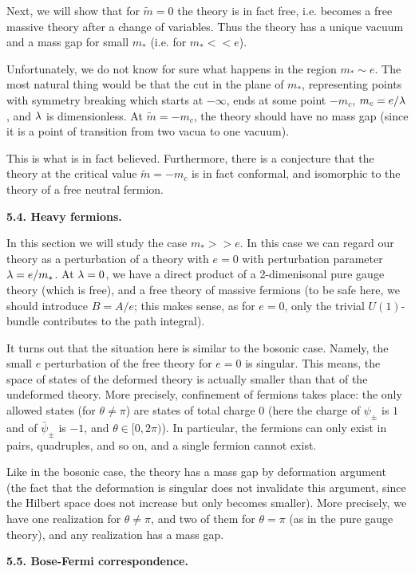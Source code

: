 Next, we will show that for $\tilde m=0$ the theory is in fact free,
i.e. becomes a free massive theory after a change of variables.
Thus the theory has a unique vacuum and a mass gap for small $m_*$
(i.e. for $m_*<<e$).  

Unfortunately, we do not know for sure what happens in the region $m_*\sim e$. 
The most natural thing would be
that the cut in the plane of $m_*$, representing points with symmetry 
breaking which starts at $-\infty$, ends at some point $-m_c$,
$m_c=e/\lambda$, and $\lambda$ is  dimensionless. 
At $\tilde m=-m_c$, the theory should have no mass gap (since it is a point 
of transition from two vacua to one vacuum).

This is what is in fact believed. Furthermore, there is a conjecture 
that the theory at the critical value $\tilde m=-m_c$ is in fact conformal, 
and isomorphic to the theory of a free neutral fermion. 

{\bf 5.4. Heavy fermions.}

In this section we will study the case $m_*>>e$. In this case we can regard 
our theory as a perturbation of a theory with $e=0$ with perturbation 
parameter $\lambda=e/m_*$. At $\lambda=0$, we have a direct product of a 2-dimenisonal
pure gauge theory (which is free), and a free theory of massive 
fermions (to be safe here, we should introduce $B=A/e$; this makes sense, as 
for $e=0$, only the trivial $U(1)$-bundle contributes to the path integral). 

It turns out that the situation here is similar to the bosonic case.
Namely, the small $e$ perturbation of the free theory for $e=0$ is singular. 
This means, the space of states 
of the deformed theory is actually smaller
than that of the undeformed theory. More precisely, confinement of 
fermions takes place: the only allowed states 
(for $\theta\ne \pi$) are 
states of total charge $0$ (here the charge of $\psi_\pm$ is 
$1$ and of $\bar\psi_\pm$ is $-1$, and $\theta\in [0,2\pi)$). 
In particular, the fermions can 
only exist in pairs, quadruples, and so on, and a single fermion cannot 
exist.   

Like in the bosonic case, the theory has a mass gap
by deformation argument (the fact that the deformation is singular
does not invalidate this argument, since the Hilbert space does not 
increase but only becomes smaller). More precisely, we have 
one realization for $\theta\ne \pi$, and two of them for $\theta=\pi$
(as in the pure gauge theory), and any realization has a mass gap.


{\bf 5.5. Bose-Fermi correspondence.}

